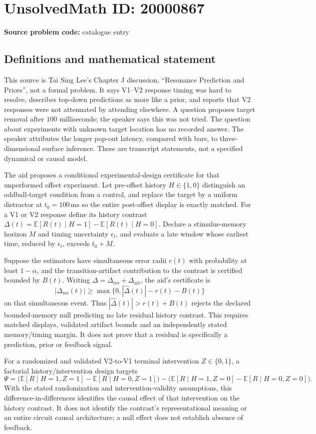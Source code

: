 \documentclass[11pt]{article}
\newcommand{\E}{\mathbb{E}}
\begin{document}
\section*{UnsolvedMath ID: 20000867}
\textbf{Source problem code:} catalogue entry
\subsection{Definitions and mathematical statement}
This source is Tai Sing Lee's Chapter J discussion, ``Resonance Prediction and Priors'', not a formal problem. It says V1--V2 response timing was hard to resolve, describes top-down predictions as more like a prior, and reports that V2 responses were not attenuated by attending elsewhere. A question proposes target removal after $100$ milliseconds; the speaker says this was not tried. The question about experiments with unknown target location has no recorded answer. The speaker attributes the longer pop-out latency, compared with bars, to three-dimensional surface inference. These are transcript statements, not a specified dynamical or causal model.

The aid proposes a conditional experimental-design certificate for that unperformed offset experiment. Let pre-offset history $H\in\{1,0\}$ distinguish an oddball-target condition from a control, and replace the target by a uniform distractor at $t_0=100\,\mathrm{ms}$ so the entire post-offset display is exactly matched. For a V1 or V2 response define its history contrast $\Delta(t)=\E[R(t)\mid H=1]-\E[R(t)\mid H=0]$. Declare a stimulus-memory horizon $M$ and timing uncertainty $\epsilon_t$, and evaluate a late window whose earliest time, reduced by $\epsilon_t$, exceeds $t_0+M$.

Suppose the estimators have simultaneous error radii $r(t)$ with probability at least $1-\alpha$, and the transition-artifact contribution to the contrast is certified bounded by $B(t)$. Writing $\Delta=\Delta_{\mathrm{res}}+\Delta_{\mathrm{art}}$, the aid's certificate is
\[
 |\Delta_{\mathrm{res}}(t)|\geq
 \max\{0,|\widehat\Delta(t)|-r(t)-B(t)\}
\]
on that simultaneous event. Thus $|\widehat\Delta(t)|>r(t)+B(t)$ rejects the declared bounded-memory null predicting no late residual history contrast. This requires matched displays, validated artifact bounds and an independently stated memory/timing margin. It does not prove that a residual is specifically a prediction, prior or feedback signal.

For a randomized and validated V2-to-V1 terminal intervention $Z\in\{0,1\}$, a factorial history/intervention design targets
\[
 \Psi=\bigl(\E[R\mid H=1,Z=1]-\E[R\mid H=0,Z=1]\bigr)
      -\bigl(\E[R\mid H=1,Z=0]-\E[R\mid H=0,Z=0]\bigr).
\]
With the stated randomization and intervention-validity assumptions, this difference-in-differences identifies the causal effect of that intervention on the history contrast. It does not identify the contrast's representational meaning or an entire circuit causal architecture; a null effect does not establish absence of feedback.
\end{document}
